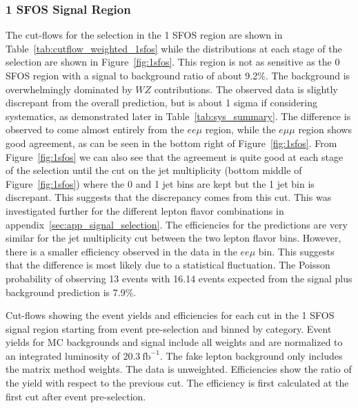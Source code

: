 \subsubsection{1 SFOS Signal Region}
The cut-flows for the selection in the 1 SFOS region are shown in Table~\ref{tab:cutflow_weighted_1sfos}
while the distributions at each stage of the selection are shown in Figure~\ref{fig:1sfos}.
This region is not as sensitive as the 0 SFOS region with a signal to background ratio of about 9.2\%.
The background is overwhelmingly dominated by $WZ$ contributions. The observed data is slightly discrepant
from the overall prediction, but is about 1 sigma if considering systematics, as demonstrated later in Table~\ref{tab:sys_summary}.
The difference is observed to come almost entirely from the $ee\mu$ region, while the $e\mu\mu$ region shows good agreement, as can
be seen in the bottom right of Figure~\ref{fig:1sfos}. From Figure~\ref{fig:1sfos} we can also see that the agreement
is quite good at each stage of the selection until the cut on the jet multiplicity (bottom middle of Figure~\ref{fig:1sfos}) where the 0 and 1 jet
bins are kept but the 1 jet bin is discrepant.  This suggests that the discrepancy comes from this cut.  This was investigated further
for the different lepton flavor combinations in appendix~\ref{sec:app_signal_selection}.  The efficiencies for the predictions
are very similar for the jet multiplicity cut between the two lepton flavor bins. However, there is a smaller efficiency observed
in the data in the $ee\mu$ bin.  This suggests that the difference is most likely due to a statistical fluctuation.
The Poisson probability of observing 13 events with 16.14 events expected from the signal plus background prediction is 7.9\%.

\begin{table}[ht!]
\centering
\scriptsize

\caption{Cut-flows showing the event yields and efficiencies for each cut in the 1 SFOS signal region
starting from event pre-selection and binned by category. 
Event yields for MC backgrounds and signal include all weights and are normalized to an integrated luminosity of $20.3~\mathrm{fb}^{-1}$.  
The fake lepton background only includes the matrix method weights.  The data is unweighted.
Efficiencies show the ratio of the yield with respect
to the previous cut.  The efficiency is first calculated at the first cut after event pre-selection.  }
\label{tab:cutflow_weighted_1sfos}
\end{table}



